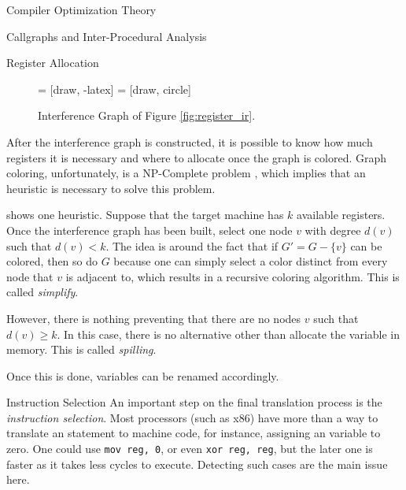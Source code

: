 \begin{section}{Compiler Optimization Theory}
\begin{section}{Callgraphs and Inter-Procedural Analysis}
\begin{subsection}{Register Allocation}
\begin{figure}
     = [draw, -latex]
     = [draw, circle]
    \begin{center}
    \end{center}
	  \caption{Interference Graph of Figure \ref{fig:register_ir}.}
	  \label{fig:interf_graph}
\end{figure}

After the interference graph is constructed, it is possible to know how
much registers it is necessary and where to allocate once the graph is colored.
Graph coloring, unfortunately, is a NP-Complete problem
\citep{karp1972reducibility}, which implies that an heuristic is necessary to
solve this problem.

\cite{appel2004modern} shows one heuristic. Suppose that the target machine has
$k$ available registers. Once the interference graph has been built, select one
node $v$ with degree $d(v)$ such that $d(v) < k$. The idea is around the fact that
if $G' = G - \{v\}$ can be colored, then so do $G$ because one can simply select
a color distinct from every node that $v$ is adjacent to, which results in a 
recursive coloring algorithm. This is called \textit{simplify}.

However, there is nothing preventing that there are no nodes $v$ such that
$d(v) \geq k$. In this case, there is no alternative other than allocate the
variable in memory. This is called \textit{spilling}.

Once this is done, variables can be renamed accordingly.

\end{subsection}

\begin{subsection}{Instruction Selection}
	An important step on the final translation process is the
	\textit{instruction selection}. Most processors (such as x86) have more
	than a way to translate an statement to machine code, for instance, 
	assigning an variable to zero. One could use \texttt{mov reg, 0}, or
	even \texttt{xor reg, reg}, but the later one is faster as it takes less
	cycles to execute. Detecting such cases are the main issue here.


\end{subsection}
\end{section}
\end{section}
